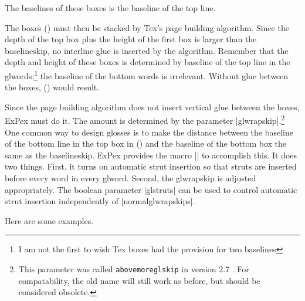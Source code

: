 \a {}
\xe
The baselines of these boxes is the baseline of the top line.

The boxes (\lastx) must then be stacked by Tex's page building
algorithm. Since the depth of the top box plus the height of the
first box is larger than the baselineskip, no interline glue is
inserted by the algorithm. Remember that the depth and height of
these boxes is determined by baseline of the top line in the
glwords;\footnote{I am not the first to wish Tex boxes had the
provision for two baselines} the baseline of the bottom words is
irrelevant. Without glue between the boxes, (\nextx) would
result.

\ex
{}
\xe

Since the page building algorithm does not insert vertical glue
between the boxes, ExPex must do it.  The amount is determined by
the parameter |glwrapskip|.\footnote{This parameter was called
{\tt abovemoreglskip} in version 2.7 .  For compatability, the
old name will still work as before, but should be considered
obsolete.} One common way to design glosses is to make the
distance between the baseline of the bottom line in the top box
in (\lastx) and the baseline of the bottom box the same as the
baselineskip. ExPex provides the macro |\normalglwrapskips| to
accomplish this. It does two things.  First, it turns on
automatic strut insertion so that struts are inserted before
every word in every glword. Second, the glwrapskip is adjusted
appropriately.  The boolean parameter |glstruts| can be used to
control automatic strut insertion independently of
|normalglwrapskips|.

Here are some examples.

